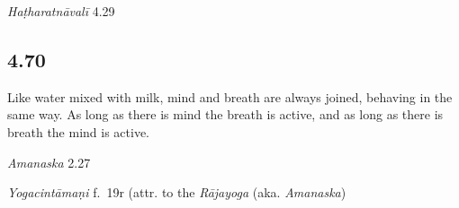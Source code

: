 \begin{ekdosis}

\begin{testimonia}[hp04_069]
\emph{Haṭharatnāvalī} 4.29
\begin{versinnote}
\end{versinnote}
\end{testimonia}

\begin{philcomm}[hp04_069]
\end{philcomm}

\subsection*{4.70}
\begin{translation}[hp04_070]
 Like water mixed with milk, mind and breath are always joined, behaving in the same way.  As long as there is mind the breath is active, and as long as there is breath the mind is active.
\end{translation}


\begin{sources}[hp04_070]
\emph{Amanaska} 2.27
\begin{versinnote}
\tl{\var{sadaiva ] NI, S, N : tathaiva Cc : sad eva Na}\\!}
\end{versinnote}
\end{sources}

\begin{testimonia}[hp04_070]
\emph{Yogacintāmaṇi} f.~19r (attr. to the \emph{Rājayoga} (aka. \emph{Amanaska})
\begin{versinnote}
\end{versinnote}


\end{testimonia}
\end{ekdosis}

